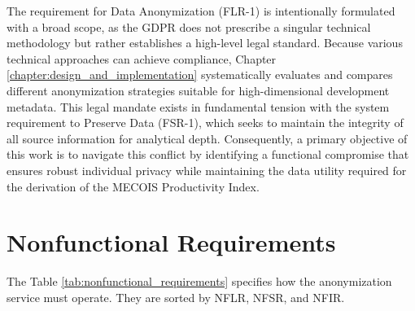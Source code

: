The requirement for Data Anonymization (FLR-1) is intentionally formulated with a broad scope, as the \ac{GDPR} does not prescribe a singular technical methodology but rather establishes a high-level legal standard. Because various technical approaches can achieve compliance, Chapter \ref{chapter:design_and_implementation} systematically evaluates and compares different anonymization strategies suitable for high-dimensional development metadata. This legal mandate exists in fundamental tension with the system requirement to Preserve Data (FSR-1), which seeks to maintain the integrity of all source information for analytical depth. Consequently, a primary objective of this work is to navigate this conflict by identifying a functional compromise that ensures robust individual privacy while maintaining the data utility required for the derivation of the MECOIS Productivity Index.

\section{Nonfunctional Requirements}
\label{sec:nonfunctional_requirements}

The Table \ref{tab:nonfunctional_requirements} specifies how the anonymization service must operate.
They are sorted by \ac{NFLR}, \ac{NFSR}, and \ac{NFIR}.

